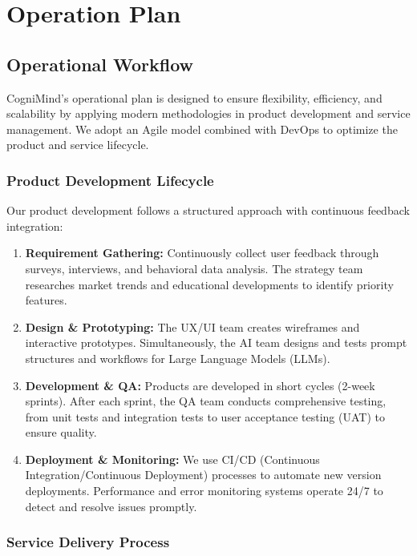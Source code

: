 \section{Operation Plan}

\subsection{Operational Workflow}

CogniMind's operational plan is designed to ensure flexibility, efficiency, and scalability by applying modern methodologies in product development and service management. We adopt an Agile model combined with DevOps to optimize the product and service lifecycle.

\subsubsection{Product Development Lifecycle}

Our product development follows a structured approach with continuous feedback integration:

\begin{enumerate}
    \item \textbf{Requirement Gathering:} Continuously collect user feedback through surveys, interviews, and behavioral data analysis. The strategy team researches market trends and educational developments to identify priority features.
    
    \item \textbf{Design \& Prototyping:} The UX/UI team creates wireframes and interactive prototypes. Simultaneously, the AI team designs and tests prompt structures and workflows for Large Language Models (LLMs).
    
    \item \textbf{Development \& QA:} Products are developed in short cycles (2-week sprints). After each sprint, the QA team conducts comprehensive testing, from unit tests and integration tests to user acceptance testing (UAT) to ensure quality.
    
    \item \textbf{Deployment \& Monitoring:} We use CI/CD (Continuous Integration/Continuous Deployment) processes to automate new version deployments. Performance and error monitoring systems operate 24/7 to detect and resolve issues promptly.
\end{enumerate}

\subsubsection{Service Delivery Process}

